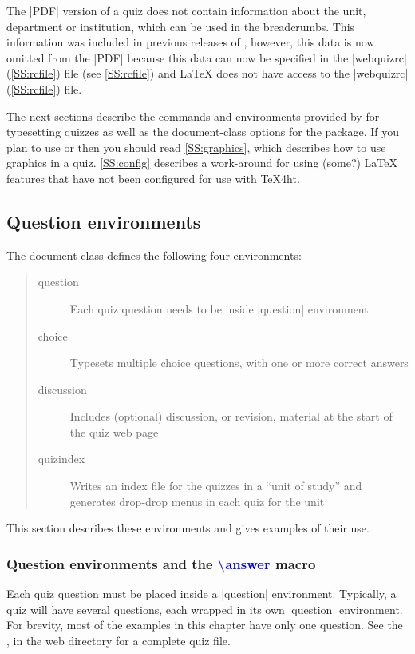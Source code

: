 \documentclass[svgnames]{article}
\newcommand\webquizrc{\index{webquizrc}%
  \BashCode|webquizrc| (\autoref{SS:rcfile})\xspace%
}
\begin{document}
  The \BashCode|PDF| version of a quiz does not contain information about
  the unit, department or institution, which can be used in the
  breadcrumbs. This information was included in previous releases of
  \WebQuiz, however, this data is now omitted from the \BashCode|PDF| because this
  data can now be specified in the \webquizrc file (see
  \autoref{SS:rcfile}) and \LaTeX{} does not have access to the
  \webquizrc file.

  The next sections describe the commands and environments provided by
  \WebQuiz for typesetting quizzes as well as the document-class options
  for the package. If you plan to use  or
   then you should read \autoref{SS:graphics}, which
  describes how to use graphics in a \WebQuiz quiz.
  \autoref{SS:config} describes a work-around for using (some?) \LaTeX{}
  features that have not been configured for use with \TeX4ht.

\subsection{Question environments}

The \WebQuiz document class defines the following four environments:
\begin{quote}
  \begin{description}
    \item[question] Each quiz question needs to be inside
    \LatexCode|question| environment
    \item[choice] Typesets multiple choice questions, with
    one or more correct answers
    \item[discussion] Includes (optional) discussion, or revision,
    material at the start of the quiz web page
    \item[quizindex] Writes an index file for the quizzes in
    a ``unit of study'' and generates drop-drop menus in each quiz for
    the unit
  \end{description}
\end{quote}
This section describes these environments and gives examples
of their use.

\subsubsection{Question environments and the \textcolor{blue}{\textbackslash answer} macro}

Each quiz question must be
placed inside a \LatexCode|question| environment. Typically, a quiz will have
several questions, each wrapped in its own \LatexCode|question| environment.
For brevity, most of the examples in this chapter have only one
question. See the \OnineManual , in the \WebQuiz web
directory for a complete quiz file.
\end{document}
